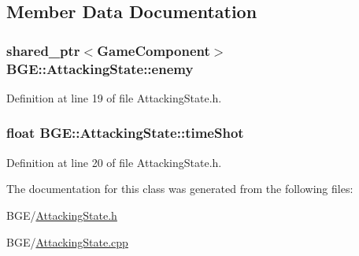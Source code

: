 \subsection{Member Data Documentation}
\hypertarget{class_b_g_e_1_1_attacking_state_aa6055274f8431a6f2bfeae8e7b47f46f}{
\subsubsection[{enemy}]{\setlength{\rightskip}{0pt plus 5cm}shared\-\_\-ptr$<${\bf Game\-Component}$>$ B\-G\-E\-::\-Attacking\-State\-::enemy}}\label{class_b_g_e_1_1_attacking_state_aa6055274f8431a6f2bfeae8e7b47f46f}


Definition at line 19 of file Attacking\-State.\-h.

\hypertarget{class_b_g_e_1_1_attacking_state_ab886e975d65afe0bcfdfe2a50d7d6d6d}{
\subsubsection[{time\-Shot}]{\setlength{\rightskip}{0pt plus 5cm}float B\-G\-E\-::\-Attacking\-State\-::time\-Shot}}\label{class_b_g_e_1_1_attacking_state_ab886e975d65afe0bcfdfe2a50d7d6d6d}


Definition at line 20 of file Attacking\-State.\-h.



The documentation for this class was generated from the following files\-:\begin{DoxyCompactItemize}
\item 
B\-G\-E/\hyperlink{_attacking_state_8h}{Attacking\-State.\-h}\item 
B\-G\-E/\hyperlink{_attacking_state_8cpp}{Attacking\-State.\-cpp}\end{DoxyCompactItemize}

